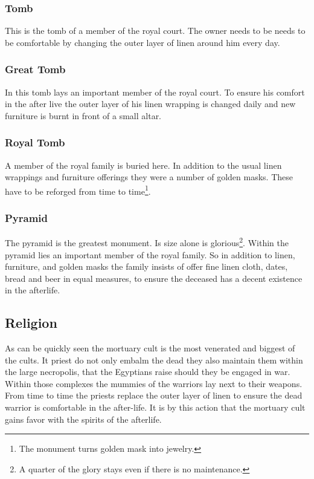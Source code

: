 \documentclass[a4paper]{article}
\begin{document}
		\subsubsection{Tomb}
			This is the tomb of a member of the royal court.
			The owner needs to be needs to be comfortable by changing
			the outer layer of linen around him every day.

		\subsubsection{Great Tomb}
			In this tomb lays an important member of the royal court.
			To ensure his comfort in the after live the outer layer
			of his linen wrapping is changed daily and new furniture
			is burnt in front of a small altar.

		\subsubsection{Royal Tomb}
			A member of the royal family is buried here.
			In addition to the usual linen wrappings and furniture offerings
			they were a number of golden masks.
			These have to be reforged from time to time\footnote{
				The monument turns golden mask into jewelry.
			}.

		\subsubsection{Pyramid}
			The pyramid is the greatest monument.
			Is size alone is glorious\footnote{
				A quarter of the glory stays even if there is no maintenance.
			}.
			Within the pyramid lies an important member of the royal family.
			So in addition to linen, furniture, and golden masks
			the family insists of offer fine linen cloth, dates, bread and beer
			in equal measures, to ensure the deceased has a decent  existence
			in the afterlife.


	\subsection{Religion}
		As can be quickly seen the mortuary cult is the most venerated and biggest of the cults.
		It priest do not only embalm the dead they also maintain them within the large necropolis,
		that the \gls{Egyptians} raise should they be engaged in war.
		Within those complexes the mummies of the warriors lay next to their weapons.
		From time to time the priests replace the outer layer of linen to ensure the dead warrior
		is comfortable in the after-life.
		It is by this action that the mortuary cult gains favor with the spirits of the afterlife.
\end{document}
